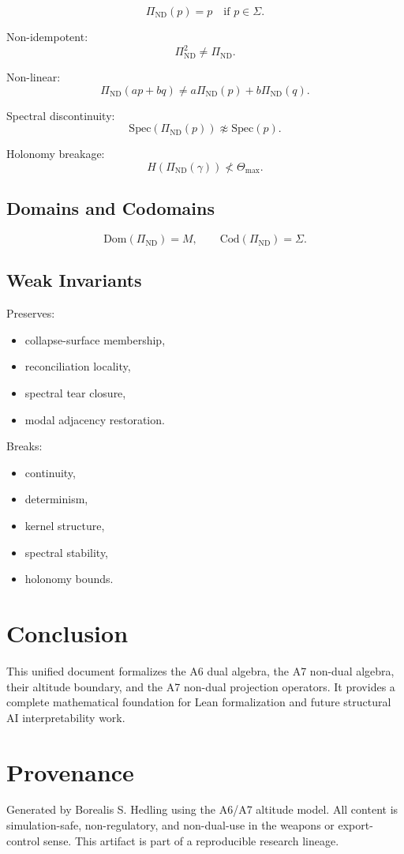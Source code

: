 \documentclass[11pt]{article}
\begin{document}
\[
\Pi_{\mathrm{ND}}(p) = p \quad \text{if } p \in \Sigma.
\]

Non-idempotent:
\[
\Pi_{\mathrm{ND}}^2 \ne \Pi_{\mathrm{ND}}.
\]

Non-linear:
\[
\Pi_{\mathrm{ND}}(ap + bq) \ne a\Pi_{\mathrm{ND}}(p) + b\Pi_{\mathrm{ND}}(q).
\]

Spectral discontinuity:
\[
\mathrm{Spec}(\Pi_{\mathrm{ND}}(p)) \not\approx \mathrm{Spec}(p).
\]

Holonomy breakage:
\[
H(\Pi_{\mathrm{ND}}(\gamma)) \not< \Theta_{\max}.
\]

\subsection{Domains and Codomains}
\[
\mathrm{Dom}(\Pi_{\mathrm{ND}}) = M,
\qquad
\mathrm{Cod}(\Pi_{\mathrm{ND}}) = \Sigma.
\]

\subsection{Weak Invariants}
Preserves:
\begin{itemize}
  \item collapse-surface membership,
  \item reconciliation locality,
  \item spectral tear closure,
  \item modal adjacency restoration.
\end{itemize}

Breaks:
\begin{itemize}
  \item continuity,
  \item determinism,
  \item kernel structure,
  \item spectral stability,
  \item holonomy bounds.
\end{itemize}

\section{Conclusion}

This unified document formalizes the A6 dual algebra, the A7 non-dual algebra,
their altitude boundary, and the A7 non-dual projection operators. It provides a
complete mathematical foundation for Lean formalization and future structural AI
interpretability work.

\section*{Provenance}

Generated by Borealis S. Hedling using the A6/A7 altitude model. All content is
simulation-safe, non-regulatory, and non-dual-use in the weapons or
export-control sense. This artifact is part of a reproducible research lineage.
\end{document}

